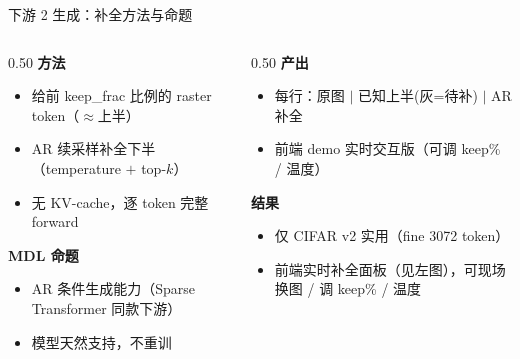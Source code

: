 \documentclass[10pt,aspectratio=169]{beamer}
\begin{document}
\begin{frame}{下游 2 生成：补全方法与命题}
\begin{columns}[T]
\begin{column}{0.50\textwidth}
\small
\textbf{方法}
\begin{itemize}\setlength{\itemsep}{2pt}
  \item 给前 keep\_frac 比例的 raster token（$\approx$上半）
  \item AR 续采样补全下半（temperature $+$ top-$k$）
  \item 无 KV-cache，逐 token 完整 forward
\end{itemize}

\bigskip
\textbf{MDL 命题}
\begin{itemize}
  \item AR 条件生成能力（Sparse Transformer 同款下游）
  \item 模型天然支持，不重训
\end{itemize}
\end{column}
\begin{column}{0.50\textwidth}
\small
\textbf{产出}
\begin{itemize}\setlength{\itemsep}{2pt}
  \item 每行：原图 $|$ 已知上半(灰=待补) $|$ AR 补全
  \item 前端 demo 实时交互版（可调 keep\% / 温度）
\end{itemize}

\bigskip
\textbf{结果}
\begin{itemize}\setlength{\itemsep}{2pt}
  \item 仅 CIFAR v2 实用（fine 3072 token）
  \item 前端实时补全面板（见左图），可现场换图 / 调 keep\% / 温度
\end{itemize}
\end{column}
\end{columns}
\end{frame}
\end{document}

